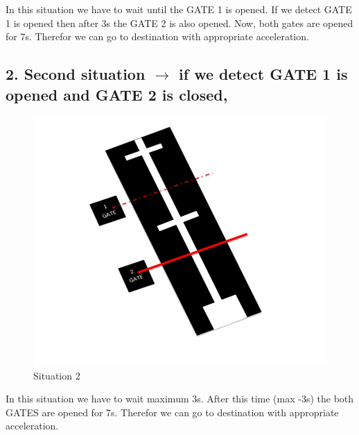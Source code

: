 \documentclass[a4paper, 12pt]{article}
\begin{document}
        In this situation we have to wait until the GATE 1 is opened. If we detect GATE 1 is opened then after 3s the GATE 2 is also opened. Now, both gates are opened for 7s. Therefor we can go to destination with appropriate acceleration.
        
    \subsection*{2.	Second situation $\rightarrow$ if we detect GATE 1 is opened and GATE 2 is closed,}
        \begin{figure}[h]
            \centering
            \includegraphics[scale = 0.5]{images/sit2.jpg}
            \caption{Situation 2}
            \label{fig:my_label}
        \end{figure}
        
        In this situation we have to wait maximum 3s. After this time (max -3s) the both GATES are opened for 7s. Therefor we can go to destination with appropriate acceleration. 
    
\end{document}
